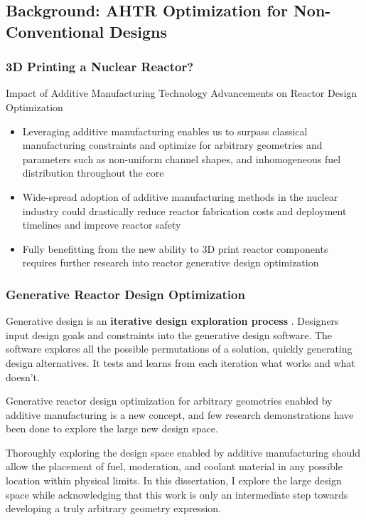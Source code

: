 \subsection{Background: AHTR Optimization for Non-Conventional Designs}
\begin{frame}
    \frametitle{3D Printing a Nuclear Reactor?}
    \begin{block}{Impact of Additive Manufacturing Technology Advancements on 
        Reactor Design Optimization}
        \begin{itemize}
            \item Leveraging additive manufacturing enables us to surpass classical 
            manufacturing constraints and optimize for arbitrary geometries and parameters 
            such as non-uniform channel shapes, and inhomogeneous fuel distribution 
            throughout the core
            \item Wide-spread adoption of additive manufacturing methods in the nuclear industry 
            could drastically reduce reactor fabrication costs and deployment timelines 
            and improve reactor safety
            \item Fully benefitting from the new ability to 3D print reactor components 
            requires further research into reactor generative design optimization
          \end{itemize}
    \end{block}
  \end{frame}

  \begin{frame}
    \frametitle{Generative Reactor Design Optimization}
    Generative design is an \textbf{iterative design exploration process} \cite{autodesk_autodesk_2020}. 
    Designers input design goals and constraints into the generative design software. 
    The software explores all the possible permutations of a solution, quickly generating 
    design alternatives. 
    It tests and learns from each iteration what works and what doesn't.

    Generative reactor design optimization for arbitrary geometries enabled by additive 
    manufacturing is a new concept, and few research demonstrations have been done to 
    explore the large new design space.

    Thoroughly exploring the design space enabled by additive manufacturing should allow the 
    placement of fuel, moderation, and coolant material in any possible location within 
    physical limits. 
    In this dissertation, I explore the large design space while acknowledging that this 
    work is only an intermediate step towards developing a truly arbitrary geometry 
    expression.
  \end{frame}

